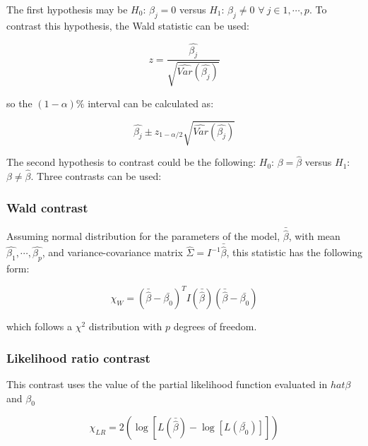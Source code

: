 \documentclass[11pt]{book} %
\begin{document}
      The first hypothesis may be $H_0$: $\beta_j=0$ versus $H_1$: $\beta_j\neq0$ $\forall \ j \in {1,\cdots,p}$. To contrast this hypothesis, the Wald statistic can be used:

      \begin{equation}
        z=\frac{\widehat{\beta_j}}{\sqrt{\widehat{Var}(\widehat{\beta_j})}}
        \label{eq:cox-hyp-contrast-1-wald}
      \end{equation}

      so the $(1-\alpha)\%$ interval can be calculated as:

      \begin{equation}
        \widehat{\beta_j}\pm z_{1-\alpha/2}\sqrt{\widehat{Var}(\widehat{\beta_j})}
        \label{eq:cox-hyp-contrast-1-wald-interval}
      \end{equation}

      The second hypothesis to contrast could be the following: $H_0$: $\beta=\widehat{\beta}$ versus $H_1$: $\beta\neq\widehat{\beta}$. Three contrasts can be used:

      \subsubsection{Wald contrast}

        Assuming normal distribution for the parameters of the model, $\bar{\widehat{\beta}}$, with mean $\widehat{\beta_1},\cdots,\widehat{\beta_p}$, and variance-covariance matrix $\widehat{\Sigma} = I^{-1}\bar{\widehat{\beta}}$, this statistic has the following form:

        \begin{equation}
          \chi_W = (\bar{\widehat{\beta}} - \bar{\beta_0})^TI(\bar{\widehat{\beta}})(\bar{\widehat{\beta}} - \bar{\beta_0})
          \label{eq:cox-wald-contrast}
        \end{equation}

        which follows a $\chi^2$ distribution with $p$ degrees of freedom.

      \subsubsection{Likelihood ratio contrast}

        This contrast uses the value of the partial likelihood function evaluated in $hat{\beta}$ and $\beta_0$

        \begin{equation}
          \chi_{LR} = 2\left(\log[L(\bar{\widehat{\beta}}) -  \log[L(\bar{\beta_0})]]\right)
          \label{eq:cox-lr-contrast}
        \end{equation}
\end{document}
